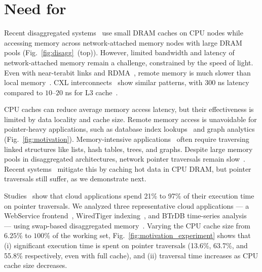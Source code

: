 

\section{Need for \pulse}
\label{sec:needforpulse}


Recent disaggregated systems~\cite{legoos, mind} use small DRAM caches on CPU nodes while accessing memory across network-attached memory nodes with large DRAM pools (Fig.~\ref{fig:disagg}~(top)). However, limited bandwidth and latency of network-attached memory remain a challenge, constrained by the speed of light. Even with near-terabit links and RDMA~\cite{rdmalatency}, remote memory is much slower than local memory~\cite{disagg}. CXL interconnects~\cite{cxl} show similar patterns, with $300$ ns latency compared to $10$--$20$ ns for L3 cache~\cite{pond}. 

CPU caches can reduce average memory access latency, but their effectiveness is limited by data locality and cache size. Remote memory access is unavoidable for pointer-heavy applications, such as database index lookups~\cite{hash1, hash2, hash3, succinct, trie2, btree1, btree2, trie1, blowfish, trie3, surf} and graph analytics~\cite{powergraph, graphx, graphchi, pagerank} (Fig.~\ref{fig:motivation}). Memory-intensive applications~\cite{scuba, cachelib, tao, memcache, flighttracker, twittercache, spark} often require traversing linked structures like lists, hash tables, trees, and graphs. Despite large memory pools in disaggregated architectures, network pointer traversals remain slow~\cite{disagg}. Recent systems~\cite{disagg, legoos, mind, infiniswap, fastswap} mitigate this by caching hot data in CPU DRAM, but pointer traversals still suffer, as we demonstrate next.

 Studies~\cite{graphchi, monetdb, spark, voltdb, memc3, db1000, memcached} show that cloud applications spend 21\% to 97\% of their execution time on pointer traversals. We analyzed three representative cloud applications — a WebService frontend~\cite{aifm}, WiredTiger indexing~\cite{wiredtiger}, and BTrDB time-series analysis~\cite{btrdb} — using swap-based disaggregated memory~\cite{infiniswap}. Varying the CPU cache size from $6.25\%$ to $100\%$ of the working set, Fig.~\ref{fig:motivation_experiment} shows that (i) significant execution time is spent on pointer traversals (13.6\%, 63.7\%, and 55.8\% respectively, even with full cache), and (ii) traversal time increases as CPU cache size decreases.

